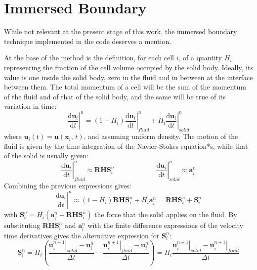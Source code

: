 \documentclass[11pt, a4paper, oneside, openany]{book}
\begin{document}
\section{Immersed Boundary}\label{Chapter_Solver_Section_Immersed_Boundary}
While not relevant at the present stage of this work, the immersed boundary technique implemented in the code deserves a mention.\par
At the base of the method is the definition, for each cell $i$, of a quantity $H_{i}$ representing the fraction of the cell volume occupied by the solid body. Ideally, its value is one inside the solid body, zero in the fluid and in between at the interface between them. 
The total momentum of a cell will be the sum of the momentum of the fluid and of that of the solid body, and the same will be true of its variation in time:
\begin{equation*}
\left.\dfrac{\mathrm{d}\boldsymbol{u}_{i}}{\mathrm{d}t}\right|^{n}=\left(1-H_{i}\right)\left.\dfrac{\mathrm{d}\boldsymbol{u}_{i}}{\mathrm{d}t}\right|^{n}_{fluid}+H_{i}\left.\dfrac{\mathrm{d}\boldsymbol{u}_{i}}{\mathrm{d}t}\right|^{n}_{solid}\label{IBM_01}
\end{equation*}
where $\boldsymbol{u}_{i}\left(t\right)=\boldsymbol{u}\left(\boldsymbol{x}_{i},\,t\right)$, and assuming uniform density. The motion of the fluid is given by the time integration of the Navier-Stokes equation*s, while that of the solid is usually given:
\begin{equation*}
\left.\dfrac{\mathrm{d}\boldsymbol{u}_{i}}{\mathrm{d}t}\right|^{n}_{fluid}\approx\boldsymbol{RHS}^{n}_{i}\qquad\qquad\qquad\left.\dfrac{\mathrm{d}\boldsymbol{u}_{i}}{\mathrm{d}t}\right|^{n}_{solid}\approx\boldsymbol{a}^{n}_{i}
\end{equation*}
Combining the previous expressions gives:
\begin{equation*}
\left.\dfrac{\mathrm{d}\boldsymbol{u}_{i}}{\mathrm{d}t}\right|^{n}\approx\left(1-H_{i}\right)\boldsymbol{RHS}^{n}_{i}+H_{i}\boldsymbol{a}^{n}_{i}=\boldsymbol{RHS}^{n}_{i}+\boldsymbol{S}^{n}_{i}\label{IBM_02}
\end{equation*}
with $\boldsymbol{S}^{n}_{i}=H_{i}\left(\boldsymbol{a}^{n}_{i}-\boldsymbol{RHS}^{n}_{i}\right)$ the force that the solid applies on the fluid. By substituting $\boldsymbol{RHS}^{n}_{i}$ and $\boldsymbol{a}^{n}_{i}$ with the finite difference expressions of the velocity time derivatives gives the alternative expression for $\boldsymbol{S}^{n}_{i}$:
\begin{equation*}
\boldsymbol{S}^{n}_{i}=H_{i}\left(\dfrac{\left.\boldsymbol{u}_{i}^{n+1}\right|_{solid}-\boldsymbol{u}_{i}^{n}}{\Delta t}-\dfrac{\left.\boldsymbol{u}_{i}^{n+1}\right|_{fluid}-\boldsymbol{u}_{i}^{n}}{\Delta t}\right)=H_{i}\dfrac{\left.\boldsymbol{u}_{i}^{n+1}\right|_{solid}-\left.\boldsymbol{u}_{i}^{n+1}\right|_{fluid}}{\Delta t}
\end{equation*}
\end{document}
